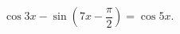 \begin{ex}[type=equation]
	\begin{condition}
		$\ \cos 3x-\sin {\left(7x -\dfrac{\pi}{2}\right)} = \cos 5x. $
	\end{condition}
\end{ex}